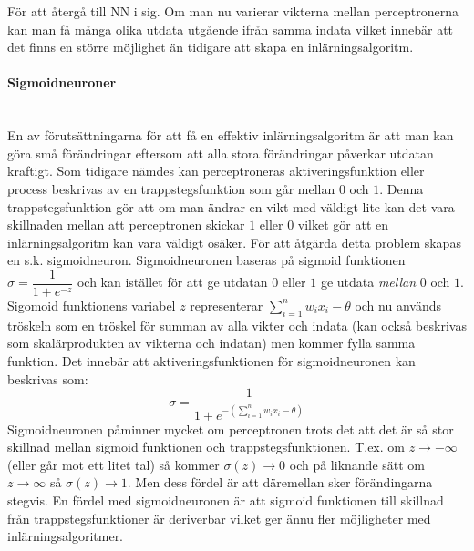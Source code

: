 \documentclass[a4paper,10pt]{article}
\begin{document}
För att återgå till NN i sig. Om man nu varierar vikterna mellan perceptronerna kan man få många olika utdata utgående ifrån samma indata vilket innebär att det finns en större möjlighet än tidigare att skapa en inlärningsalgoritm. 

\paragraph{Sigmoidneuroner}\hspace{0pt}\\
En av förutsättningarna för att få en effektiv inlärningsalgoritm är att man kan göra små förändringar eftersom att alla stora förändringar påverkar utdatan kraftigt. Som tidigare nämdes kan perceptroneras aktiveringsfunktion eller process beskrivas av en trappstegsfunktion som går mellan $0$ och $1$. Denna trappstegsfunktion gör att om man ändrar en vikt med väldigt lite kan det vara skillnaden mellan att perceptronen skickar $1$ eller $0$ \autocite{NNDL}vilket gör att en inlärningsalgoritm kan vara väldigt osäker. För att åtgärda detta problem skapas en s.k. sigmoidneuron. Sigmoidneuronen baseras på sigmoid funktionen $\sigma=\dfrac{1}{1+e^{-z}}$ och kan istället för att ge utdatan $0$ eller $1$ ge utdata \emph{ mellan} $0$ och $1$. Sigomoid funktionens variabel $z$ representerar $\sum_{i=1}^{n} {w_ix_i} -\theta$ och nu används tröskeln som en tröskel för summan av alla vikter och indata (kan också beskrivas som skalärprodukten av vikterna och indatan) men kommer fylla samma funktion. Det innebär att aktiveringsfunktionen för sigmoidneuronen kan beskrivas som:
\[\sigma=\dfrac{1}{1+e^{-(\sum_{i=1}^{n} {w_ix_i} -\theta)}}\]
Sigmoidneuronen påminner mycket om perceptronen trots det att det är så stor skillnad mellan sigmoid funktionen och trappstegsfunktionen. T.ex. om $z\to -\infty$ (eller går mot ett litet tal) så kommer $\sigma(z)\to 0$ och på liknande sätt om $z\to \infty$ så $\sigma(z)\to 1$. Men dess fördel är att däremellan sker förändingarna stegvis.
En fördel med sigmoidneuronen är att sigmoid funktionen till skillnad från trappstegsfunktioner är deriverbar vilket ger ännu fler möjligheter med inlärningsalgoritmer.
\end{document}
